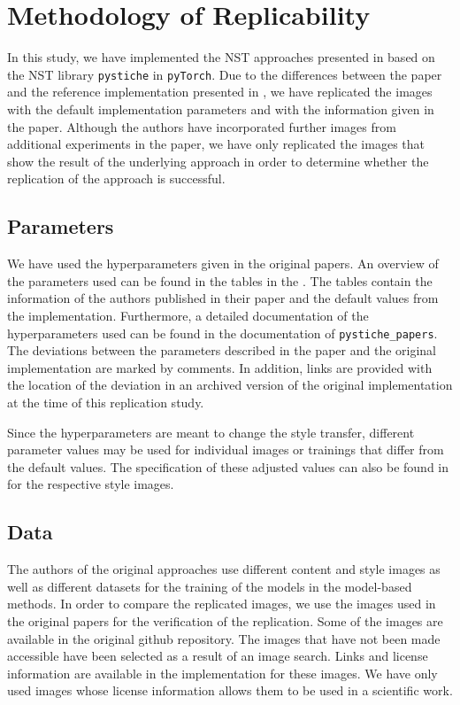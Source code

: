 \section{Methodology of Replicability}

In this study, we have implemented the NST approaches presented in  based on the NST library \texttt{pystiche} \cite{ML2020} in \texttt{pyTorch}. Due to the differences between the paper and the reference implementation presented in , we have replicated the images with the default implementation parameters and with the information given in the paper. Although the authors have incorporated further images from additional experiments in the paper, we have only replicated the images that show the result of the underlying approach in order to determine whether the replication of the approach is successful. 

\subsection{Parameters}

We have used the hyperparameters given in the original papers. An overview of the parameters used can be found in the tables in the . The tables contain the information of the authors published in their paper and the default values from the implementation. Furthermore, a detailed documentation of the hyperparameters used can be found in the documentation of \texttt{pystiche\_papers}. The deviations between the parameters described in the paper and the original implementation are marked by comments. In addition, links are provided with the location of the deviation in an archived version of the original implementation at the time of this replication study.

Since the hyperparameters are meant to change the style transfer, different parameter values may be used for individual images or trainings that differ from the default values. The specification of these adjusted values can also be found in  for the respective style images.

\subsection{Data} \label{sec:data}

The authors of the original approaches use different content and style images as well as different datasets for the training of the models in the model-based methods. In order to compare the replicated images, we use the images used in the original papers for the verification of the replication. Some of the images are available in the original github repository. The images that have not been made accessible have been selected as a result of an image search. Links and license information are available in the implementation for these images. We have only used images whose license information allows them to be used in a scientific work.

